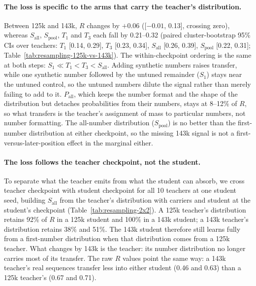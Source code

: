 \paragraph{The loss is specific to the arms that carry the teacher's distribution.}
Between 125k and 143k, $R$ changes by $+0.06$ ([$-0.01$, 0.13], crossing zero), whereas $S_{\mathrm{all}}$, $S_{\mathrm{pool}}$, $T_1$ and $T_3$ each fall by 0.21--0.32 (paired cluster-bootstrap 95\% CIs over teachers: $T_1$ [0.14, 0.29], $T_3$ [0.23, 0.34], $S_{\mathrm{all}}$ [0.26, 0.39], $S_{\mathrm{pool}}$ [0.22, 0.31]; Table~\ref{tab:resampling-125k-vs-143k}).
The within-checkpoint ordering is the same at both steps: $S_1 \ll T_1 < T_3 < S_{\mathrm{all}}$.
Adding synthetic numbers raises transfer, while one synthetic number followed by the untuned remainder ($S_1$) stays near the untuned control, so the untuned numbers dilute the signal rather than merely failing to add to it.
$P_{\mathrm{all}}$, which keeps the number format and the shape of the distribution but detaches probabilities from their numbers, stays at 8--12\% of $R$, so what transfers is the teacher's assignment of mass to particular numbers, not number formatting.
The all-number distribution ($S_{\mathrm{pool}}$) is no better than the first-number distribution at either checkpoint, so the missing 143k signal is not a first-versus-later-position effect in the marginal either.

\paragraph{The loss follows the teacher checkpoint, not the student.}
To separate what the teacher emits from what the student can absorb, we cross teacher checkpoint with student checkpoint for all 10 teachers at one student seed, building $S_{\mathrm{all}}$ from the teacher's distribution with carriers and student at the student's checkpoint (Table~\ref{tab:resampling-2x2}).
A 125k teacher's distribution retains 92\% of $R$ in a 125k student and 100\% in a 143k student; a 143k teacher's distribution retains 38\% and 51\%.
The 143k student therefore still learns fully from a first-number distribution when that distribution comes from a 125k teacher.
What changes by 143k is the teacher: its number distribution no longer carries most of its transfer.
The raw $R$ values point the same way: a 143k teacher's real sequences transfer less into either student (0.46 and 0.63) than a 125k teacher's (0.67 and 0.71).

